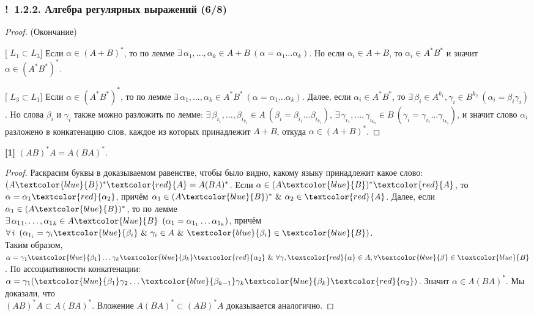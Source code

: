 \documentclass[mathserif,12pt,aspectratio=169]{beamer}
\def\NB#1{{\bf\color{brown}#1}}
\def\A#1#2{\forall\,#1\ \left(#2\right)}
\def\E#1#2{\exists\,#1\ \left(#2\right)}
\def\Tuple#1#2#3{{#1}_{#2},\dots,{#1}_{#3}}
\def\And{\operatorname{\,\&\,}}
\def\proofsection#1{\par{\color{brown}\sffamily\small  [\;}{\sffamily\small\color{brown} #1}{\sffamily\small\color{brown}\;]}\;}
\def\Ok{{\color{green}\textbf{!}\ }}
\begin{document}
\begin{frame}
\frametitle{\Ok 1.2.2. Алгебра регулярных выражений (6/8)}
\begin{proof} (Окончание)
\proofsection{$L_1\subset L_3$}
Если $\alpha\in (A+B)^*$, то по лемме 
$\E{\Tuple{\alpha}{1}{k}\in A+B}{\alpha=
\alpha_1\dots\alpha_k}$.
Но если $\alpha_i\in A+B$, 
то $\alpha_i\in A^*B^*$ 
и значит $\alpha\in (A^*B^*)^*$.
\proofsection{$L_3\subset L_1$}
Если $\alpha\in (A^*B^*)^*$, то по лемме 
$\E{\Tuple{\alpha}{1}{k}\in A^*B^*}{\alpha=
\alpha_1\dots\alpha_k}$.
Далее, если $\alpha_i \in A^*B^*$,
то $\E{\beta_i\in A^{k_1},
\gamma_i \in B^{k_2}}{\alpha_i = \beta_i \gamma_i}$.
Но слова $\beta_i$ и $\gamma_i$
также можно разложить по лемме:
$\E{\Tuple{\beta}{i_1}{i_{k_1}}\!\in\!A}{\beta_i=\beta_{i_1}\dots\beta_{i_{k_1}}}$,
$\E{\Tuple{\gamma}{i_1}{i_{k_2}}\!\in\!B}{\gamma_i=\gamma_{i_1}\dots\gamma_{i_{k_2}}}$,
 и значит слово $\alpha_i$
 разложено в конкатенацию слов,
 каждое из которых принадлежит $A+B$,
 откуда $\alpha\in (A+B)^*$. 
\end{proof}

\begin{corollary} {\NB{[1]}}
$(AB)^*A = A(BA)^*$.
\end{corollary}

\begin{proof} Раскрасим буквы в доказываемом равенстве, чтобы было видно, какому языку принадлежит какое слово:
$(A\textcolor{blue}{B})^*\textcolor{red}{A}=A(BA)^*$.
Если $\alpha\in(A\textcolor{blue}{B})^*\textcolor{red}{A}$,
то  $\alpha=\alpha_1\textcolor{red}{\alpha_2}$, 
причём $\alpha_1\in(A\textcolor{blue}{B})^*\And \alpha_2\in \textcolor{red}{A}$. 
Далее, если $\alpha_1\in(A\textcolor{blue}{B})^*$, 
то по лемме\\ 
$\E{\Tuple{\alpha_{1}}{1}{k}\in A\textcolor{blue}{B}}{\alpha_{1}=\alpha_{1_1}\ldots\alpha_{1_k}}$, 
причём
 $\A{i}{\alpha_{1_i}=\gamma_i\textcolor{blue}{\beta_i}\And
\gamma_i\in A \And \textcolor{blue}{\beta_i}\in \textcolor{blue}{B}}$.\\ 
Таким образом, $\alpha=\gamma_1\textcolor{blue}{\beta_1}\ldots\gamma_k\textcolor{blue}{\beta_k}\textcolor{red}{\alpha_2}\And\forall\gamma,\textcolor{red}{\alpha}\in A,\forall\textcolor{blue}{\beta} \in \textcolor{blue}{B}$. По ассоциативности конкатенации: $\alpha=\gamma_1(\textcolor{blue}{\beta_1}\gamma_2\ldots\textcolor{blue}{\beta_{k-1}}\gamma_k\textcolor{blue}{\beta_k}\textcolor{red}{\alpha_2})$. Значит $\alpha\in A(BA)^*$. Мы доказали, что \\$(AB)^*A\subset A(BA)^*$. Вложение $A(BA)^*\subset (AB)^*A$ доказывается аналогично.
\end{proof}
\end{frame}
\end{document}
